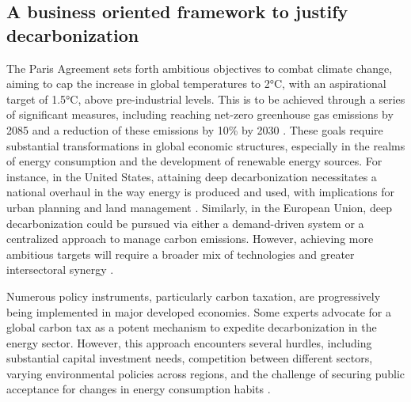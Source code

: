 \subsection{A business oriented framework to justify decarbonization}
\noindent The Paris Agreement sets forth ambitious objectives to combat climate change, aiming to cap the increase in global temperatures to 2°C, with an aspirational target of 1.5°C, above pre-industrial levels. This is to be achieved through a series of significant measures, including reaching net-zero greenhouse gas emissions by 2085 and a reduction of these emissions by 10\% by 2030 \cite{Sanderson2016What}. These goals require substantial transformations in global economic structures, especially in the realms of energy consumption and the development of renewable energy sources. For instance, in the United States, attaining deep decarbonization necessitates a national overhaul in the way energy is produced and used, with implications for urban planning and land management \cite{Hsu2022Planning}. Similarly, in the European Union, deep decarbonization could be pursued via either a demand-driven system or a centralized approach to manage carbon emissions. However, achieving more ambitious targets will require a broader mix of technologies and greater intersectoral synergy \cite{Korkmaz2020A}.

\noindent Numerous policy instruments, particularly carbon taxation, are progressively being implemented in major developed economies. Some experts advocate for a global carbon tax as a potent mechanism to expedite decarbonization in the energy sector. However, this approach encounters several hurdles, including substantial capital investment needs, competition between different sectors, varying environmental policies across regions, and the challenge of securing public acceptance for changes in energy consumption habits \cite{Papadis2020Challenges}.


